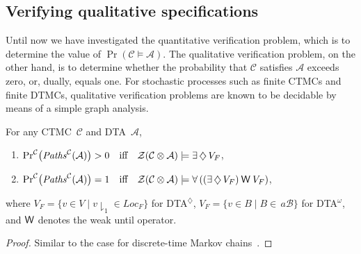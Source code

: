 \documentclass{LMCS}
\newcommand{\mc}[1]{\mathcal{#1}}
\newcommand{\<}{\langle}
\renewcommand{\>}{\rangle}
\newcommand{\mC}{\mathcal{C}}
\newcommand{\mB}{\mathcal{B}}
\newcommand{\mA}{\mathcal{A}}
\newcommand{\BSCC}{\textsc{BSCC}}
\newcommand{\CTMC}{\textsc{{CTMC}}}
\newcommand{\DTA}{\textsc{DTA}}
\newcommand{\DTAr}{\DTA$^{\!\Ever}$}
\newcommand{\DTAo}{\DTA$^{\omega}$}
\newcommand{\Paths}{{\it Paths}}
\newcommand{\F}{\mathop{\diamondsuit}}
\newcommand{\Ever}{\F}
\begin{document}
\iffalse
\begin{rem}\label{remark:whyBSCC}
We deliberately consider BSCCs in the DTMP $\mc{Z}(\mC \otimes \mA)$
rather than BSCCs in $\mC \otimes \mA$.
For instance, our example contains two \BSCC s in $\mC \otimes \mA$:
$\{\ell_1,\ell_2,\ell_3\}$ and $\{\ell_4,\ell_5,\ell_6\}$, cf.\
Figure~\ref{fig:infinite_region}.
As turned out in the example, only the latter forms a \BSCC\ in the DTMP
$\mc{Z}(\mC \otimes \mA)$ while the former does not.
\marginpar{explain why.}
This is because the guards on the transitions play a role in determining the
acceptance of a path.
The impact of guards, however, is not immediate in $\mC \otimes \mA$,
but is implicit in the region graph.
\end{rem}
\fi

\subsection*{Verifying qualitative specifications}\label{sec:qualitative}
Until now we have investigated the quantitative verification problem, which is to determine
the value of $\Pr(\mc{C} \models \mc{A})$.
The qualitative verification problem, on the other hand, is to determine whether the
probability that $\mc{C}$ satisfies $\mc{A}$ exceeds zero, or, dually, equals one.
For stochastic processes such as finite CTMCs and finite DTMCs, qualitative verification
problems are known to be decidable by means of a simple graph analysis.

\begin{prop}
 For any \CTMC\ $\mc{C}$ and \DTA\ $\mc{A}$,
\begin{enumerate}[(1)]
\item
$\Pr^\mC\!\big(\Paths^\mc{C} (\mc{A})\big) > 0
\quad \mbox{iff} \quad
\mc{Z}(\mc{C} \otimes \mc{A}) \models \exists \Ever V_F$,
\item
$\Pr^\mC\!\big(\Paths^\mc{C} (\mc{A})\big) = 1
\quad \mbox{iff} \quad
\mc{Z}(\mc{C} \otimes \mc{A}) \models \forall \left(\left(\exists\Ever V_F\right)\W V_F\right)$,
\end{enumerate}
where $V_F{=}\{v{\in} V\mid v{\downharpoonright_1}{\in} Loc_F\}$ for \DTAr,
$V_F{=}\big\{v {\in} B \mid B{\in} \, a\mB \big\}$ for \DTAo, and $\mathbin{\mathsf{W}}$ denotes the
weak until operator.
\end{prop}

\begin{proof}
Similar to the case for discrete-time Markov chains~\cite[Chapter 10]{BaKa08}.
\end{proof}
\end{document}
